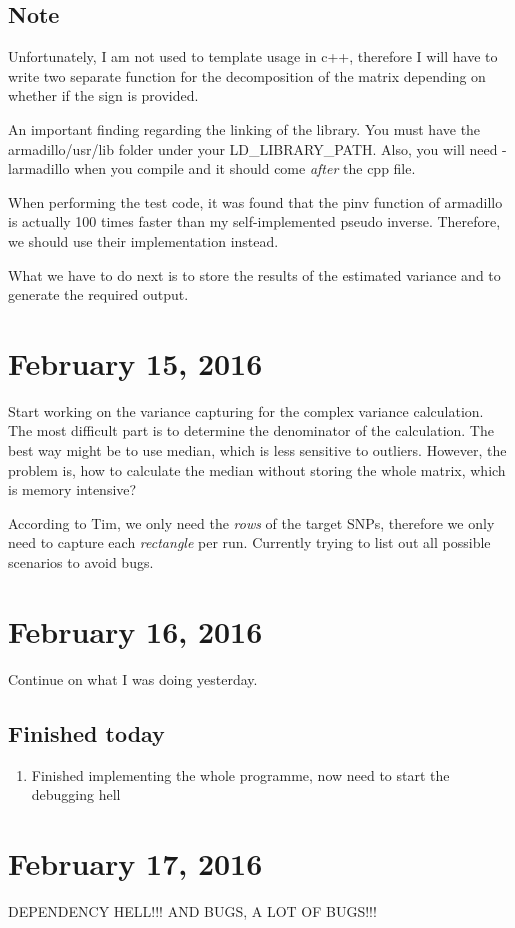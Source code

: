\documentclass[12pt]{article}
\begin{document}
	\subsection{Note}
	Unfortunately, I am not used to template usage in c++, therefore I will have to write two separate function for the decomposition of the matrix depending on whether if the sign is provided.
	
	An important finding regarding the linking of the library.
	You must have the armadillo/usr/lib folder under your LD\_LIBRARY\_PATH.
	Also, you will need -larmadillo when you compile and it should come \emph{after} the cpp file.
	
	When performing the test code, it was found that the pinv function of armadillo is actually 100 times faster than my self-implemented pseudo inverse. 
	Therefore, we should use their implementation instead.
	
	What we have to do next is to store the results of the estimated variance and to generate the required output.
	\section {February 15, 2016}
	Start working on the variance capturing for the complex variance calculation.
	The most difficult part is to determine the denominator of the calculation.
	The best way might be to use median, which is less sensitive to outliers.
	However, the problem is, how to calculate the median without storing the whole matrix, which is memory intensive?
	
	According to Tim, we only need the \emph{rows} of the target SNPs, therefore we only need to capture each \emph{rectangle} per run.
	Currently trying to list out all possible scenarios to avoid bugs.
	
	\section{February 16, 2016}
	Continue on what I was doing yesterday.
	\subsection{Finished today}
	\begin{enumerate}
		\item Finished implementing the whole programme, now need to start the debugging hell
	\end{enumerate}
	\section{February 17, 2016}
	DEPENDENCY HELL!!!
	AND BUGS, A LOT OF BUGS!!!
\end{document}
